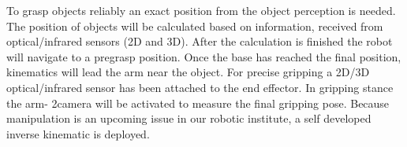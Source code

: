 To grasp objects reliably an exact position from the object perception is needed. The position of
objects will be calculated based on information, received from optical/infrared sensors (2D and 3D).
After the calculation is finished the robot will navigate to a pregrasp position. Once the base has
reached the final position, kinematics will lead the arm near the object. For precise gripping a
2D/3D optical/infrared sensor has been attached to the end effector. In gripping stance the arm-
2camera will be activated to measure the final gripping pose. Because manipulation is an upcoming
issue in our robotic institute, a self developed inverse kinematic is deployed.
